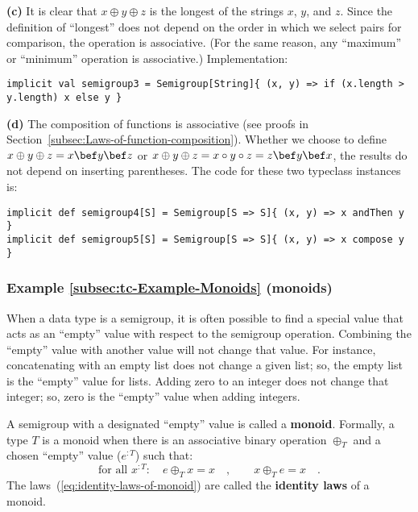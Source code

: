 \textbf{(c)} It is clear that $x\oplus y\oplus z$ is the longest
of the strings $x$, $y$, and $z$. Since the definition of \textsf{``}longest\textsf{''}
does not depend on the order in which we select pairs for comparison,
the operation is associative. (For the same reason, any \textsf{``}maximum\textsf{''}
or \textsf{``}minimum\textsf{''} operation is associative.) Implementation:
\begin{lstlisting}
implicit val semigroup3 = Semigroup[String]{ (x, y) => if (x.length > y.length) x else y }
\end{lstlisting}

\textbf{(d)} The composition of functions is associative (see proofs
in Section~\ref{subsec:Laws-of-function-composition}). Whether we
choose to define $x\oplus y\oplus z=x\bef y\bef z$ or $x\oplus y\oplus z=x\circ y\circ z=z\bef y\bef x$,
the results do not depend on inserting parentheses. The code for these
two typeclass instances is:
\begin{lstlisting}
implicit def semigroup4[S] = Semigroup[S => S]{ (x, y) => x andThen y }
implicit def semigroup5[S] = Semigroup[S => S]{ (x, y) => x compose y }
\end{lstlisting}


\subsubsection{Example \label{subsec:tc-Example-Monoids}\ref{subsec:tc-Example-Monoids}
(monoids)}

When a data type is a semigroup, it is often possible to find a special
value that acts as an \textsf{``}empty\textsf{''} value with respect to the semigroup
operation. Combining the \textsf{``}empty\textsf{''} value with another value will
not change that value. For instance, concatenating with an empty list
does not change a given list; so, the empty list is the \textsf{``}empty\textsf{''}
value for lists. Adding zero to an integer does not change that integer;
so, zero is the \textsf{``}empty\textsf{''} value when adding integers.

A semigroup with a designated \textsf{``}empty\textsf{''} value is called a \textbf{monoid}.
Formally, a type $T$ is a monoid when there is an associative binary
operation $\oplus_{T}$ and a chosen \textsf{``}empty\textsf{''} value ($e^{:T}$)
such that: 
\begin{equation}
\text{for all }x^{:T}:\quad e\oplus_{T}x=x\quad,\quad\quad x\oplus_{T}e=x\quad.\label{eq:identity-laws-of-monoid}
\end{equation}
The laws~(\ref{eq:identity-laws-of-monoid}) are called the \textbf{identity
laws} of a monoid. 

